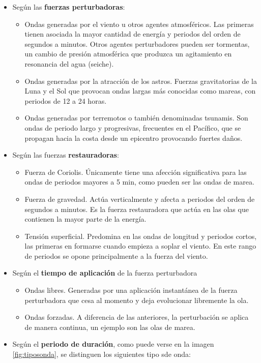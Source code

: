 \begin{itemize}
\item
  Según las \textbf{fuerzas perturbadoras}:

  \begin{itemize}
  \item
    Ondas generadas por el viento u otros agentes atmosféricos. Las
    primeras tienen asociada la mayor cantidad de energía y periodos del
    orden de segundos a minutos. Otros agentes perturbadores pueden ser
    tormentas, un cambio de presión atmosférica que produzca un
    agitamiento en resonancia del agua (seiche).
  \item
    Ondas generadas por la atracción de los astros. Fuerzas
    gravitatorias de la Luna y el Sol que provocan ondas largas más
    conocidas como mareas, con periodos de 12 a 24 horas.
  \item
    Ondas generadas por terremotos o también denominadas tsunamis. Son
    ondas de periodo largo y progresivas, frecuentes en el Pacífico, que
    se propagan hacia la costa desde un epicentro provocando fuertes
    daños.
  \end{itemize}
\item
  Según las fuerzas \textbf{restauradoras}:

  \begin{itemize}
  \item
    Fuerza de Coriolis. Únicamente tiene una afección significativa para
    las ondas de periodos mayores a 5 min, como pueden ser las ondas de
    marea.
  \item
    Fuerza de gravedad. Actúa verticalmente y afecta a periodos del
    orden de segundos a minutos. Es la fuerza restauradora que actúa en
    las olas que contienen la mayor parte de la energía.
  \item
    Tensión superficial. Predomina en las ondas de longitud y periodos
    cortos, las primeras en formarse cuando empieza a soplar el viento.
    En este rango de periodos se opone principalmente a la fuerza del
    viento.
  \end{itemize}
\item
  Según el \textbf{tiempo de aplicación} de la fuerza perturbadora

  \begin{itemize}
  \item
    Ondas libres. Generadas por una aplicación instantánea de la fuerza
    perturbadora que cesa al momento y deja evolucionar libremente la
    ola.
  \item
    Ondas forzadas. A diferencia de las anteriores, la perturbación se
    aplica de manera continua, un ejemplo son las olas de marea.
  \end{itemize}
\item
  Según el \textbf{periodo de duración}, como puede verse en la imagen \autoref{fig:tiposonda}, se distinguen los siguientes tipo sde onda:


\end{itemize}
